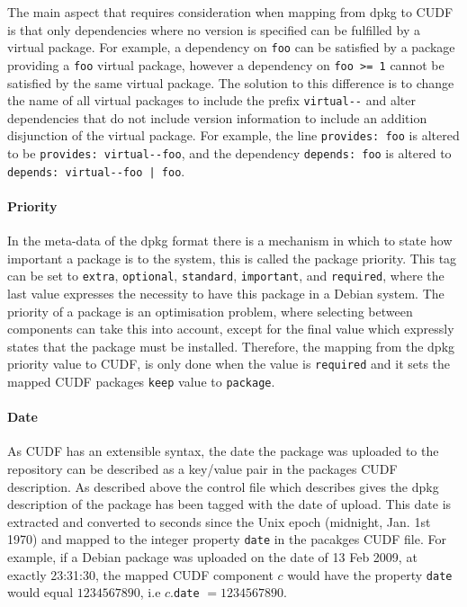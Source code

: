The main aspect that requires consideration when mapping from dpkg to CUDF is that only dependencies where no version is specified can be fulfilled by a virtual package.
For example, a dependency on \verb+foo+ can be satisfied by a package providing a \verb+foo+ virtual package, 
however a dependency on \verb+foo >= 1+ cannot be satisfied by the same virtual package. 
The solution to this difference is to change the name of all virtual packages to include the prefix \verb+virtual--+ and 
alter dependencies that do not include version information to include an addition disjunction of the virtual package.
For example, the line \verb+provides: foo+ is altered to be \verb+provides: virtual--foo+, 
and the dependency \verb+depends: foo+ is altered to \verb+depends: virtual--foo | foo+.

\paragraph{Priority}
In the meta-data of the dpkg format there is a mechanism in which to state how important a package is to the system, this is called the package priority.
This tag can be set to \verb+extra+, \verb+optional+, \verb+standard+, \verb+important+, and \verb+required+, where the last value expresses the necessity to have this package in a Debian system.
The priority of a package is an optimisation problem, where selecting between components can take this into account, 
except for the final value which expressly states that the package must be installed.
Therefore, the mapping from the dpkg priority value to CUDF, is only done when the value is \verb+required+ and it sets the mapped CUDF packages \verb+keep+ value to \verb+package+.

\paragraph{Date}
As CUDF has an extensible syntax, the date the package was uploaded to the repository can be described as a key/value pair in the packages CUDF description.
As described above the control file which describes gives the dpkg description of the package has been tagged with the date of upload.
This date is extracted and converted to seconds since the Unix epoch (midnight, Jan. 1st 1970) and mapped to the integer property \verb+date+ in the pacakges CUDF file.
For example, if a Debian package was uploaded on the date of 13 Feb 2009, at exactly 23:31:30, 
the mapped CUDF component $c$ would have the property \verb+date+ would equal $1234567890$, i.e $c$.\verb+date+ $= 1234567890$.

